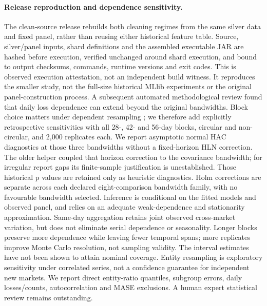 \paragraph{Release reproduction and dependence sensitivity.}
The clean-source release rebuilds both cleaning regimes from the same silver data and fixed panel, rather than reusing either historical feature table. Source, silver/panel inputs, shard definitions and the assembled executable JAR are hashed before execution, verified unchanged around shard execution, and bound to output checksums, commands, runtime versions and exit codes. This is observed execution attestation, not an independent build witness. It reproduces the smaller study, not the full-size historical MLlib experiments or the original panel-construction process.
A subsequent automated methodological review found that daily loss dependence can extend beyond the original bandwidths. Block choice matters under dependent resampling \cite{politis2004block}; we therefore add explicitly retrospective sensitivities with all 28-, 42- and 56-day blocks, circular and non-circular, and 2,000 replicates each. We report asymptotic normal HAC diagnostics at those three bandwidths without a fixed-horizon HLN correction. The older helper coupled that horizon correction to the covariance bandwidth; for irregular report gaps its finite-sample justification is unestablished. Those historical p values are retained only as heuristic diagnostics. Holm corrections are separate across each declared eight-comparison bandwidth family, with no favourable bandwidth selected.
Inference is conditional on the fitted models and observed panel, and relies on an adequate weak-dependence and stationarity approximation. Same-day aggregation retains joint observed cross-market variation, but does not eliminate serial dependence or seasonality. Longer blocks preserve more dependence while leaving fewer temporal spans; more replicates improve Monte Carlo resolution, not sampling validity. The interval estimates have not been shown to attain nominal coverage. Entity resampling is exploratory sensitivity under correlated series, not a confidence guarantee for independent new markets. We report direct entity-ratio quantiles, subgroup errors, daily losses/counts, autocorrelation and MASE exclusions. A human expert statistical review remains outstanding.
